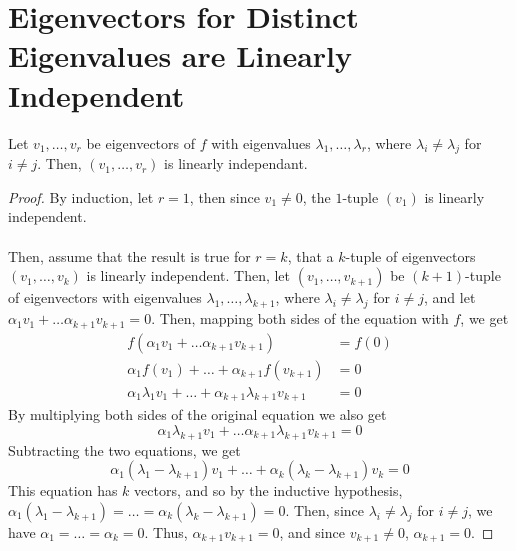 \documentclass[letterpaper,12pt]{article}
\begin{document}
\section*{Eigenvectors for Distinct Eigenvalues are Linearly Independent}
\begin{theorem}
Let $v_1, \dots, v_r$ be eigenvectors of $f$ with eigenvalues $\lambda_1, \dots, \lambda_r$, where $\lambda_i \neq \lambda_j$ for $i \neq j$. Then, $(v_1, \dots, v_r)$ is linearly independant.
\end{theorem}
\begin{proof}
By induction, let $r = 1$, then since $v_1 \neq 0$, the $1$-tuple $(v_1)$ is linearly independent.
\\ \\ Then, assume that the result is true for $r = k$, that a $k$-tuple of eigenvectors $(v_1, \dots, v_k)$ is linearly independent. Then, let $(v_1, \dots, v_{k+1})$ be $(k+1)$-tuple of eigenvectors with eigenvalues $\lambda_1, \dots, \lambda_{k+1}$, where $\lambda_i \neq \lambda_j$ for $i \neq j$, and let $\alpha_1 v_1 + \dots \alpha_{k+1} v_{k+1} = 0$. Then, mapping both sides of the equation with $f$, we get
\begin{align*}
    f(\alpha_1 v_1 + \dots \alpha_{k+1} v_{k+1}) & = f(0) \\
    \alpha_1 f(v_1) + \dots + \alpha_{k+1} f(v_{k+1}) & = 0 \\
    \alpha_1 \lambda_1 v_1 + \dots + \alpha_{k+1} \lambda_{k+1} v_{k+1} & = 0
\end{align*}
By multiplying both sides of the original equation we also get
\begin{equation*}
    \alpha_1 \lambda_{k+1} v_1 + \dots \alpha_{k+1} \lambda_{k+1} v_{k+1} = 0
\end{equation*}
Subtracting the two equations, we get
\begin{equation*}
    \alpha_1(\lambda_1 - \lambda_{k+1}) v_1 + \dots + \alpha_k (\lambda_k - \lambda_{k+1}) v_k = 0
\end{equation*}
This equation has $k$ vectors, and so by the inductive hypothesis, $\alpha_1(\lambda_1 - \lambda_{k+1}) = \dots = \alpha_k (\lambda_k - \lambda_{k+1}) = 0$. Then, since $\lambda_i \neq \lambda_j$ for $i \neq j$, we have $\alpha_1 = \dots = \alpha_k = 0$. Thus, $\alpha_{k+1} v_{k+1} = 0$, and since $v_{k+1} \neq 0$, $\alpha_{k+1} = 0$.
\end{proof}
\end{document}
